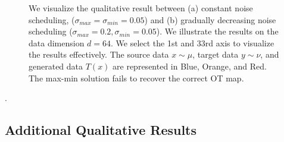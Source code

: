 \begin{figure}[h]
    \centering
    \hfill
    \vspace{-10pt}
    \caption{We visualize the qualitative result between (a) constant noise scheduling, ($\sigma_{max} = \sigma_{min} = 0.05$) and (b) gradually decreasing noise scheduling ($\sigma_{max}=0.2, \sigma_{min}=0.05$). 
    We illustrate the results on the data dimension $d=64$. We select the 1st and 33rd axis to visualize the results effectively. The source data $x \sim \mu$, target data $y \sim \nu$, and generated data $T(x)$ are represented in Blue, Orange, and Red. The max-min solution fails to recover the correct OT map.}
    \label{fig:const}
\end{figure}

\begin{table}[h]
    \centering
    \caption{\textbf{Quantitative comparison of numerical accuracy} on synthetic datasets. The Const column stands for the constant noise scheduling, and Ours stands for our method which gradually decrease the noise level. Each model is evaluated by target distribution error $D_{target} (\downarrow)$}.
    \label{tab:appen_const}
\end{table}



\subsection{Additional Qualitative Results} \label{appen:addtional_qual}


